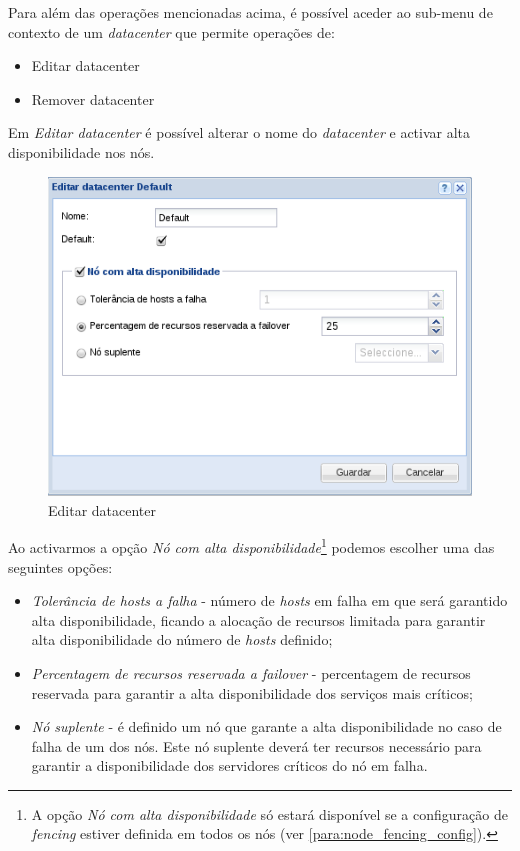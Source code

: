 Para além das operações mencionadas acima, é possível aceder ao sub-menu de contexto de um \emph{datacenter} que permite operações de:
\begin{itemize}
    \item Editar datacenter
    \item Remover datacenter
\end{itemize}

Em \emph{Editar datacenter} é possível alterar o nome do \emph{datacenter} e activar alta disponibilidade nos nós. 
\begin{figure}[H]
	\begin{center}
	\includegraphics[scale=0.5]{screenshots/cluster_edit.png}
	\caption{Editar datacenter}
	\label{fig:cluster_edit}
	\end{center}
\end{figure}

Ao activarmos a opção \emph{Nó com alta disponibilidade}\footnote{A opção \emph{Nó com alta disponibilidade} só estará disponível se a configuração de \emph{fencing} estiver definida em todos os nós (ver \ref{para:node_fencing_config}).} podemos escolher uma das seguintes opções:

\begin{itemize}
    \item \emph{Tolerância de hosts a falha} - número de \emph{hosts} em falha em que será garantido alta disponibilidade, ficando a alocação de recursos limitada para garantir alta disponibilidade do número de \emph{hosts} definido;
    \item \emph{Percentagem de recursos reservada a failover} - percentagem de recursos reservada para garantir a alta disponibilidade dos serviços mais críticos;
    \item \emph{Nó suplente} - é definido um nó que garante a alta disponibilidade no caso de falha de um dos nós. Este nó suplente deverá ter recursos necessário para garantir a disponibilidade dos servidores críticos do nó em falha.
\end{itemize}

